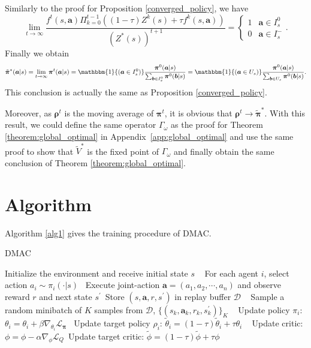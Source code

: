 \documentclass{article}
\begin{document}
    Similarly to the proof for Proposition \ref{converged_policy}, we have
    \begin{equation}
        \lim_{t \to \infty}\frac{f^t(s,\bm{a})\Pi_{k=0}^{t-1} \left( (1-\tau) Z^k(s) + \tau f^k(s,\bm{a})\right)}{\left( Z^*(s) \right)^{t+1}} = \begin{cases}
            1 & \bm{a} \in I^0_s \\
            0 & \bm{a} \in I^-_s
        \end{cases}.
    \end{equation}
    Finally we obtain 
    \begin{equation}
        \tilde{\bm{\pi}}^*(\bm{a}|s) = \lim_{t \to \infty} \bm{\pi}^t(\bm{a}|s) = \mathbbm{1}{(\bm{a} \in I^0_s)} \frac{\bm{\pi}^0(\bm{a}|s)}{\sum_{\bm{b} \in I^0_s}\bm{\pi}^0(\bm{b}|s)} = \mathbbm{1}{(\bm{a} \in U_s)} \frac{\bm{\pi}^0(\bm{a}|s)}{\sum_{\bm{b} \in U_s}\bm{\pi}^0(\bm{b}|s)}.
    \end{equation}
    This conclusion is actually the same as Proposition \ref{converged_policy}.
    
    Moreover, as $\bm{\rho}^t$ is the moving average of $\bm{\pi}^t$, it is obvious that $\bm{\rho}^t \to \tilde{\bm{\pi}}^*$. With this result, we could define the same operator $\Gamma_\omega$ as the proof for Theorem \ref{theorem:global_optimal} in Appendix~\ref{app:global_optimal} and use the same proof to show that $\tilde{V}^*$ is the fixed point of $\Gamma_\omega$ and finally obtain the same conclusion of Theorem \ref{theorem:global_optimal}.
\section{Algorithm}
\label{app:algo}
	
	Algorithm \ref{alg1} gives the training procedure of DMAC.
	
	\begin{algorithm}[h]
		\caption{DMAC}
		\label{alg1}
		\begin{algorithmic}[1]
			\STATE Initialize the environment and receive initial state $s$ \
			\STATE For each agent $i$, select action $a_i \sim \pi_i(\cdot|s)$ \
			\STATE Execute joint-action $\bm{a} = (a_1,a_2,\cdots,a_n)$ and observe reward $r$ and next state $s^{\prime}$\
			\STATE Store $(s,\bm{a},r,s^{\prime})$ in replay buffer $\mathcal{D}$ \
			\ENDFOR
			\STATE Sample a random minibatch of $K$ samples from $\mathcal{D}$, $\{(s_k,\bm{a}_k,r_k,s^{\prime}_k)\}_K$ \
			\STATE Update policy $\pi_i$: $\theta_i = \theta_i + \beta \nabla_{\theta_i}
			\mathcal{L}_{\bm{\pi}}$	\ 	
			\STATE Update target policy $\rho_i$: $\tilde{\theta}_i= (1-\tau)\tilde{\theta}_i + \tau \theta_i$ \
			\ENDFOR
			\STATE Update critic: $\phi = \phi - \alpha \nabla_\phi \mathcal{L}_Q$\
			\STATE Update target critic: $\tilde{\phi} =(1-\tau) \tilde{\phi}+\tau \phi$ \
			\ENDFOR
		\end{algorithmic}
	\end{algorithm}
\end{document}
